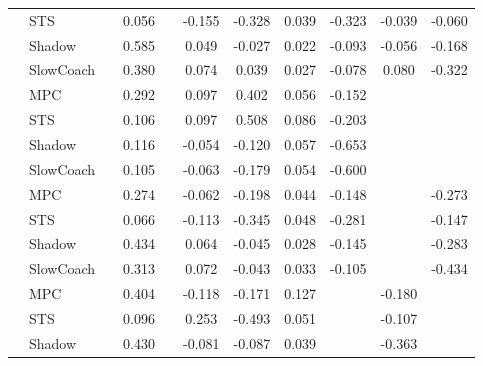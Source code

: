 \begin{tabular}{|l|l|*{9}{c|}}
                                                           & STS &       &     0.056 &        & -0.155 & -0.328 &  0.039 &  -0.323 &  -0.039 &   -0.060 \\
                                                           & Shadow &       &     0.585 &        &  0.049 & -0.027 &  0.022 &  -0.093 &  -0.056 &   -0.168 \\
                                                           & SlowCoach &       &     0.380 &        &  0.074 &  0.039 &  0.027 &  -0.078 &   0.080 &   -0.322 \\
\midrule
[False, True, False, True, True, True, True, False, False] & MPC &       &     0.292 &        &  0.097 &  0.402 &  0.056 &  -0.152 &      &       \\
                                                           & STS &       &     0.106 &        &  0.097 &  0.508 &  0.086 &  -0.203 &      &       \\
                                                           & Shadow &       &     0.116 &        & -0.054 & -0.120 &  0.057 &  -0.653 &      &       \\
                                                           & SlowCoach &       &     0.105 &        & -0.063 & -0.179 &  0.054 &  -0.600 &      &       \\
\midrule
[False, True, False, True, True, True, True, False, True] & MPC &       &     0.274 &        & -0.062 & -0.198 &  0.044 &  -0.148 &      &   -0.273 \\
                                                           & STS &       &     0.066 &        & -0.113 & -0.345 &  0.048 &  -0.281 &      &   -0.147 \\
                                                           & Shadow &       &     0.434 &        &  0.064 & -0.045 &  0.028 &  -0.145 &      &   -0.283 \\
                                                           & SlowCoach &       &     0.313 &        &  0.072 & -0.043 &  0.033 &  -0.105 &      &   -0.434 \\
\midrule
[False, True, False, True, True, True, False, True, False] & MPC &       &     0.404 &        & -0.118 & -0.171 &  0.127 &      &  -0.180 &       \\
                                                           & STS &       &     0.096 &        &  0.253 & -0.493 &  0.051 &      &  -0.107 &       \\
                                                           & Shadow &       &     0.430 &        & -0.081 & -0.087 &  0.039 &      &  -0.363 &       \\

\end{tabular}
